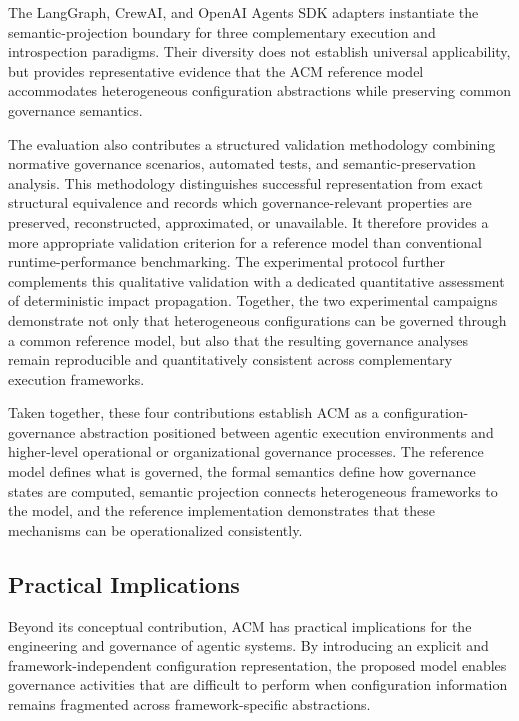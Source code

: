 \documentclass[10pt]{article}
\begin{document}
The LangGraph, CrewAI, and OpenAI Agents SDK adapters instantiate the semantic-projection boundary for three complementary execution and introspection paradigms. Their diversity does not establish universal applicability, but provides representative evidence that the ACM reference model accommodates heterogeneous configuration abstractions while preserving common governance semantics. 

The evaluation also contributes a structured validation methodology combining normative governance scenarios, automated tests, and semantic-preservation analysis. This methodology distinguishes successful representation from exact structural equivalence and records which governance-relevant properties are preserved, reconstructed, approximated, or unavailable. It therefore provides a more appropriate validation criterion for a reference model than conventional runtime-performance benchmarking. The experimental protocol further complements this qualitative validation with a dedicated quantitative assessment of deterministic impact propagation. Together, the two experimental campaigns demonstrate not only that heterogeneous configurations can be governed through a common reference model, but also that the resulting governance analyses remain reproducible and quantitatively consistent across complementary execution frameworks.

Taken together, these four contributions establish ACM as a configuration-governance abstraction positioned between agentic execution environments and higher-level operational or organizational governance processes. The reference model defines what is governed, the formal semantics define how governance states are computed, semantic projection connects heterogeneous frameworks to the model, and the reference implementation demonstrates that these mechanisms can be operationalized consistently.

\subsection{Practical Implications}
\label{sec:practical_implications}

Beyond its conceptual contribution, ACM has practical implications for the engineering and governance of agentic systems. By introducing an explicit and framework-independent configuration representation, the proposed model enables governance activities that are difficult to perform when configuration information remains fragmented across framework-specific abstractions.
\end{document}
